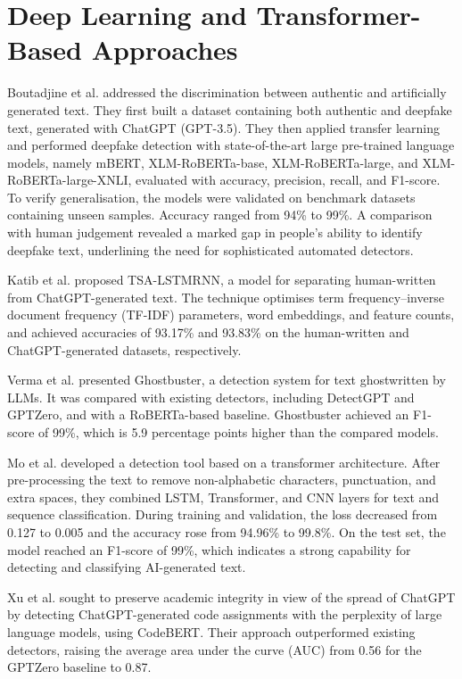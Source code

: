 \section{Deep Learning and Transformer-Based Approaches}
\label{sec:lr_deep}

Boutadjine et al. \cite{boutadjine2025} addressed the discrimination between authentic and artificially generated text. They first built a dataset containing both authentic and deepfake text, generated with ChatGPT (GPT-3.5). They then applied transfer learning and performed deepfake detection with state-of-the-art large pre-trained language models, namely mBERT, XLM-RoBERTa-base, XLM-RoBERTa-large, and XLM-RoBERTa-large-XNLI, evaluated with accuracy, precision, recall, and F1-score. To verify generalisation, the models were validated on benchmark datasets containing unseen samples. Accuracy ranged from 94\% to 99\%. A comparison with human judgement revealed a marked gap in people's ability to identify deepfake text, underlining the need for sophisticated automated detectors.

Katib et al. \cite{katib2023} proposed TSA-LSTMRNN, a model for separating human-written from ChatGPT-generated text. The technique optimises term frequency--inverse document frequency (TF-IDF) parameters, word embeddings, and feature counts, and achieved accuracies of 93.17\% and 93.83\% on the human-written and ChatGPT-generated datasets, respectively.

Verma et al. \cite{verma2024} presented Ghostbuster, a detection system for text ghostwritten by LLMs. It was compared with existing detectors, including DetectGPT and GPTZero, and with a RoBERTa-based baseline. Ghostbuster achieved an F1-score of 99\%, which is 5.9 percentage points higher than the compared models.

Mo et al. \cite{mo2024} developed a detection tool based on a transformer architecture. After pre-processing the text to remove non-alphabetic characters, punctuation, and extra spaces, they combined LSTM, Transformer, and CNN layers for text and sequence classification. During training and validation, the loss decreased from 0.127 to 0.005 and the accuracy rose from 94.96\% to 99.8\%. On the test set, the model reached an F1-score of 99\%, which indicates a strong capability for detecting and classifying AI-generated text.

Xu et al. \cite{xu2024} sought to preserve academic integrity in view of the spread of ChatGPT by detecting ChatGPT-generated code assignments with the perplexity of large language models, using CodeBERT. Their approach outperformed existing detectors, raising the average area under the curve (AUC) from 0.56 for the GPTZero baseline to 0.87.

